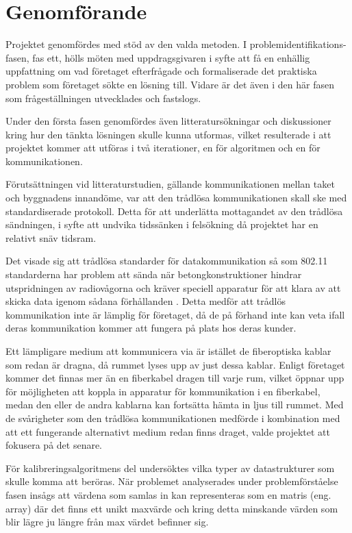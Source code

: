 \section{Genomförande} %
\label{sec:genomf_rande}

    Projektet genomfördes med stöd av den valda metoden. I problemidentifikations-fasen, fas ett, hölls möten med uppdragsgivaren i syfte att få en enhällig uppfattning om vad företaget efterfrågade och formaliserade det praktiska problem som företaget sökte en lösning till. Vidare är det även i den här fasen som frågeställningen utvecklades och fastslogs. \bigskip

    Under den första fasen genomfördes även litteratursökningar och diskussioner kring hur den tänkta lösningen skulle kunna utformas, vilket resulterade i att projektet kommer att utföras i två iterationer, en för algoritmen och en för kommunikationen. \bigskip

    Förutsättningen vid litteraturstudien, gällande kommunikationen mellan taket och byggnadens innandöme, var att den trådlösa kommunikationen skall ske med standardiserade protokoll. Detta för att underlätta mottagandet av den trådlösa sändningen, i syfte att undvika tidssänken i felsökning då projektet har en relativt snäv tidsram.\bigskip

    Det visade sig att trådlösa standarder för datakommunikation så som 802.11 standarderna har problem att sända när betongkonstruktioner hindrar utspridningen av radiovågorna och kräver speciell apparatur för att klara av att skicka data igenom sådana förhållanden \cite{11n}. Detta medför att trådlös kommunikation inte är lämplig för företaget, då de på förhand inte kan veta ifall deras kommunikation kommer att fungera på plats hos deras kunder. \bigskip

    Ett lämpligare medium att kommunicera via är istället de fiberoptiska kablar som redan är dragna, då rummet lyses upp av just dessa kablar. Enligt företaget kommer det finnas mer än en fiberkabel dragen till varje rum, vilket öppnar upp för möjligheten att koppla in apparatur för kommunikation i en fiberkabel, medan den eller de andra kablarna kan fortsätta hämta in ljus till rummet. Med de svårigheter som den trådlösa kommunikationen medförde i kombination med att ett fungerande alternativt medium redan finns draget, valde projektet att fokusera på det senare. \bigskip

    För kalibreringsalgoritmens del undersöktes vilka typer av datastrukturer som skulle komma att beröras. När problemet analyserades under problemförståelse fasen insågs att värdena som samlas in kan representeras som en matris (eng. array) där det finns ett unikt maxvärde och kring detta minskande värden som blir lägre ju längre från max värdet befinner sig.


